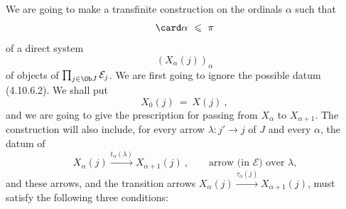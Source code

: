 We are going to make a transfinite construction on the ordinals $\alpha$ such that
\[
\card\alpha\ \leqslant\ \pi
\]
of a direct system
\[
(X_\alpha(j))_\alpha
\]
of objects of $\prod_{j\in\Ob J}\mathcal{E}_j$. We are first going to ignore the possible datum (4.10.6.2). We shall put
\[
X_0(j)\ =\ X(j)\ , \tag*{(4.10.6.4)}
\]
and we are going to give the prescription for passing from $X_\alpha$ to $X_{\alpha+1}$. The construction will also include, for every arrow $\lambda : j'\longrightarrow j$ of $J$ and every $\alpha$, the datum of
\[
X_\alpha(j) \xrightarrow{t_\alpha(\lambda)} X_{\alpha+1}(j)\ , \qquad \text{arrow (in $\mathcal{E}$) over $\lambda$,} \tag*{(4.10.6.5)} %
\]
and these arrows, and the transition arrows $X_\alpha(j)\xrightarrow{\tau_\alpha(j)}X_{\alpha+1}(j)$, must
satisfy the following three conditions:
